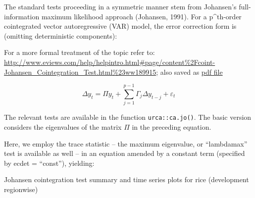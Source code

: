 \documentclass[12pt,]{article}
\begin{document}
The standard tests proceeding in a symmetric manner stem from Johansen's full-information maximum likelihood approach (Johansen, 1991). For a p\^{}th-order cointegrated vector autoregressive (VAR) model, the error correction form is (omitting deterministic components):

For a more formal treatment of the topic refer to: \url{http://www.eviews.com/help/helpintro.html\#page/content\%2Fcoint-Johansen_Cointegration_Test.html\%23ww189915}; also saved as \href{./literatures/johansen_cointegration_eviews.pdf}{pdf file}

\[
\Delta y_t = \Pi y_t + \sum_{j = 1}^{p-1} {\Gamma_j \Delta y_{t-j}} + \varepsilon_t
\]

The relevant tests are available in the function \texttt{urca::ca.jo()}. The basic version considers the eigenvalues of the matrix \(\Pi\) in the preceding equation.

Here, we employ the trace statistic -- the maximum eigenvalue, or ``lambdamax'' test is available as well -- in an equation amended by a constant term (specified by ecdet = ``const''), yielding:

Johansen cointegration test summary and time series plots for rice (development regionwise)
\end{document}
